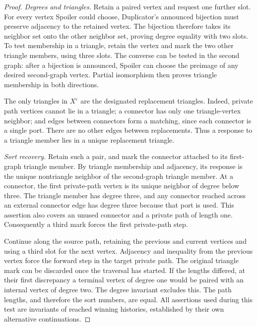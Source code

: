 \documentclass[11pt]{article}
\theoremstyle{definition}
\newcommand{\eps}{\varepsilon}
\begin{document}
\begin{proof}
\emph{Degrees and triangles.}
Retain a paired vertex and request one further slot.
For every vertex Spoiler could choose, Duplicator's announced
bijection must preserve adjacency to the retained vertex.
The bijection therefore takes its neighbor set onto the other
neighbor set, proving degree equality with two slots.
To test membership in a triangle, retain the vertex and mark the two
other triangle members, using three slots.
The converse can be tested in the second graph: after a bijection is
announced, Spoiler can choose the preimage of any desired
second-graph vertex.  Partial isomorphism then proves triangle
membership in both directions.

The only triangles in \(X^\eps\) are the designated replacement
triangles.
Indeed, private path vertices cannot lie in a triangle; a connector
has only one triangle-vertex neighbor; and edges between connectors
form a matching, since each connector is a single port.
There are no other edges between replacements.
Thus a response to a triangle member lies in a unique replacement
triangle.

\emph{Sort recovery.}
Retain such a pair, and mark the connector attached to its
first-graph triangle member.
By triangle membership and adjacency, its response is the unique
nontriangle neighbor of the second-graph triangle member.
At a connector, the first private-path vertex is its unique neighbor
of degree below three.
The triangle member has degree three, and any connector reached
across an external connector edge has degree three because that port
is used.  This assertion also covers an unused connector and a
private path of length one.
Consequently a third mark forces the first private-path step.

Continue along the source path, retaining the previous and current
vertices and using a third slot for the next vertex.
Adjacency and inequality from the previous vertex force the forward
step in the target private path.
The original triangle mark can be discarded once the traversal has
started.
If the lengths differed, at their first discrepancy a terminal vertex
of degree one would be paired with an internal vertex of degree two.
The degree invariant excludes this.
The path lengths, and therefore the sort numbers, are equal.
All assertions used during this test are invariants of reached
winning histories, established by their own alternative continuations.


\end{proof}
\end{document}
